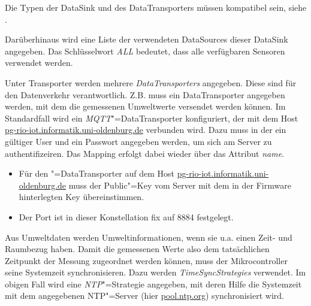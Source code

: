 \begin{mdframed}[frametitle=Hinweis]
	\begin{minipage}{\linewidth}
		Die Typen der DataSink und des DataTransporters müssen kompatibel sein, siehe .
	\end{minipage}
\end{mdframed}

Darüberhinaus wird eine Liste der verwendeten DataSources dieser DataSink angegeben.
Das Schlüsselwort \textit{ALL} bedeutet, dass alle verfügbaren Sensoren verwendet werden.

Unter Transporter werden mehrere \textit{DataTransporters} angegeben.
Diese sind für den Datenverkehr verantwortlich.
Z.B. muss ein DataTransporter angegeben werden, mit dem die gemessenen Umweltwerte versendet werden können.
Im Standardfall wird ein \textit{MQTT}"=DataTransporter konfiguriert, der mit dem Host \url{pg-rio-iot.informatik.uni-oldenburg.de} verbunden wird.
Dazu muss in der  ein gültiger User und ein Passwort angegeben werden, um sich am Server zu authentifizeiren.
Das Mapping erfolgt dabei wieder über das Attribut \textit{name}.
\begin{mdframed}[frametitle=Hinweis]
	\begin{minipage}{\linewidth}
		\begin{itemize}
			\item Für den "=DataTransporter auf dem Host \url{pg-rio-iot.informatik.uni-oldenburg.de} muss der Public"=Key vom Server mit dem in der Firmware hinterlegten Key übereinstimmen.
			\item Der Port ist in dieser Konstellation fix auf 8884 festgelegt.
		\end{itemize}
	\end{minipage}
\end{mdframed}

Aus Umweltdaten werden Umweltinformationen, wenn sie u.a. einen Zeit- und Raumbezug haben.
Damit die gemessenen Werte also dem tatsächlichen Zeitpunkt der Messung zugeordnet werden können, muss der Mikrocontroller seine Systemzeit synchronisieren.
Dazu werden \textit{TimeSyncStrategies} verwendet.
Im obigen Fall wird eine \textit{NTP}"=Strategie angegeben, mit deren Hilfe die Systemzeit mit dem angegebenen NTP"=Server (hier \url{pool.ntp.org}) synchronisiert wird.

